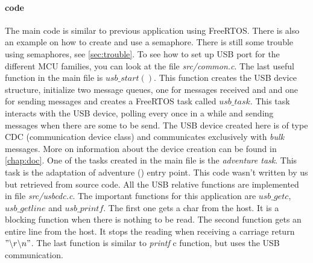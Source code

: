 \documentclass[12pt,a4paper]{report}
\begin{document}
\paragraph{code}
The main code is similar to previous application using FreeRTOS. There is also an example on how to create and use a semaphore. There is still some trouble using semaphores, see \ref{sec:trouble}. To see how to set up USB port for the different MCU families, you can look at the file \emph{src/common.c}. The last useful function in the main file is \emph{$usb\_start()$}. This function creates the USB device structure, initialize two message queues, one for messages received and and one for sending messages and creates a FreeRTOS task called $usb\_task$. This task interacts with the USB device, polling every once in a while and sending messages when there are some to be send. The USB device created here is of type CDC (communication device class) and communicates exclusively with \emph{bulk} messages. More on information about the device creation can be found in \ref{chap:doc}.\newline
One of the tasks created in the main file is the \emph{adventure task}. This task is the adaptation of adventure (\cite{adventure}) entry point. This code wasn't written by us but retrieved from \cite{Gay2018} source code.\newline
All the USB relative functions are implemented in file \emph{src/usbcdc.c}. The important functions for this application are \emph{$usb\_getc$}, \emph{$usb\_getline$} and \emph{$usb\_printf$}. The first one gets a char from the host. It is a blocking function when there is nothing to be read. The second function gets an entire line from the host. It stops the reading when receiving a carriage return $"\backslash r \backslash n"$. The last function is similar to \emph{printf} c function, but uses the USB communication.
\end{document}
